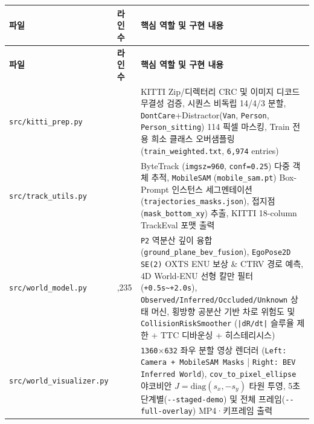 \documentclass[10.5pt,a4paper]{article}
\begin{document}
\begin{footnotesize}
\setlength{\tabcolsep}{4pt}
\setlength{\LTleft}{0pt}\setlength{\LTright}{0pt}
\begin{longtable}{>{\raggedright\arraybackslash}p{} >{\raggedright\arraybackslash}p{} >{\raggedright\arraybackslash}p{}}
\toprule
\textbf{파일} & \textbf{라인 수} & \textbf{핵심 역할 및 구현 내용} \\
\midrule
\endfirsthead
\toprule
\textbf{파일} & \textbf{라인 수} & \textbf{핵심 역할 및 구현 내용} \\
\midrule
\endhead
\bottomrule
\endfoot
\texttt{src/\allowbreak{}kitti\_\allowbreak{}prep.\allowbreak{}py} & 624 & KITTI Zip/디렉터리 CRC 및 이미지 디코드 무결성 검증, 시퀀스 비독립 14/4/3 분할, \texttt{DontCare}+Distractor(\texttt{Van}, \texttt{Person}, \texttt{Person\_\allowbreak{}sitting}) 114 픽셀 마스킹, Train 전용 희소 클래스 오버샘플링(\texttt{train\_\allowbreak{}weighted.\allowbreak{}txt}, \texttt{6,\allowbreak{}974} entries) \\
\texttt{src/\allowbreak{}track\_\allowbreak{}utils.\allowbreak{}py} & 620 & ByteTrack (\texttt{imgsz=960}, \texttt{conf=0.\allowbreak{}25}) 다중 객체 추적, \texttt{MobileSAM} (\texttt{mobile\_\allowbreak{}sam.\allowbreak{}pt}) Box-Prompt 인스턴스 세그멘테이션(\texttt{trajectories\_\allowbreak{}masks.\allowbreak{}json}), 접지점(\texttt{mask\_\allowbreak{}bottom\_\allowbreak{}xy}) 추출, KITTI 18-column TrackEval 포맷 출력 \\
\texttt{src/\allowbreak{}world\_\allowbreak{}model.\allowbreak{}py} & 1,235 & \texttt{P2} 역분산 깊이 융합(\texttt{ground\_\allowbreak{}plane\_\allowbreak{}bev\_\allowbreak{}fusion}), \texttt{EgoPose2D} \texttt{SE(2)} OXTS ENU 보상 \& CTRV 경로 예측, 4D World-ENU 선형 칼만 필터(\texttt{+0.\allowbreak{}5s\textasciitilde{}+2.\allowbreak{}0s}), \texttt{Observed/\allowbreak{}Inferred/\allowbreak{}Occluded/\allowbreak{}Unknown} 상태 머신, 횡방향 공분산 기반 차로 위험도 및 \texttt{CollisionRiskSmoother} (\texttt{|dR/\allowbreak{}dt|} 슬루율 제한 + TTC 디바운싱 + 히스테리시스) \\
\texttt{src/\allowbreak{}world\_\allowbreak{}visualizer.\allowbreak{}py} & 710 & \texttt{1360$\times$632} 좌우 분할 영상 렌더러 (\texttt{Left:\allowbreak{} Camera + MobileSAM Masks} | \texttt{Right:\allowbreak{} BEV Inferred World}), \texttt{cov\_\allowbreak{}to\_\allowbreak{}pixel\_\allowbreak{}ellipse} 야코비안 $J=\text{diag}(s_x,-s_y)$ 타원 투영, 5초 단계별(\texttt{-\allowbreak{}-\allowbreak{}staged-\allowbreak{}demo}) 및 전체 프레임(\texttt{-\allowbreak{}-\allowbreak{}full-\allowbreak{}overlay}) MP4·키프레임 출력 \\

\end{longtable}
\end{footnotesize}
\end{document}
